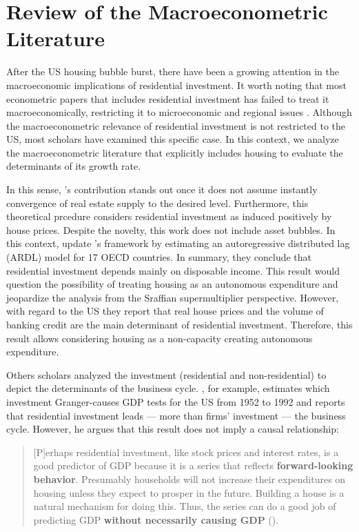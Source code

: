 \documentclass[11pt]{article}
\begin{document}
\section{Review of the Macroeconometric Literature}
\label{sec:org83eda64}
\label{sec:empirical_review}
After the US housing bubble burst, there have been a growing attention in the macroeconomic implications of residential investment.
It worth noting that most econometric papers that includes residential investment has failed to treat it macroeconomically, restricting it to microeconomic and regional issues \cite{arestis_u.s._2008}.
Although the macroeconometric relevance of residential investment is not restricted to the US, most scholars have examined this specific case.
In this context, we analyze the macroeconometric literature that explicitly includes housing to evaluate the determinants of its growth rate.

In this sense, \citeauthor{poterba_tax_1984}'s \citeyear{poterba_tax_1984} contribution stands out once it does not assume instantly convergence of real estate supply to the desired level.
Furthermore, this theoretical prcedure considers residential investment as induced positively by house prices.
Despite the novelty, this work does not include asset bubbles.
In this context,  \textcite{arestis_residential_2015} update \citeauthor{poterba_tax_1984}'s \citeyear{poterba_tax_1984} framework by estimating an autoregressive distributed lag (ARDL) model for 17 OECD countries.
In summary, they conclude that residential investment depends mainly on disposable income.
This result would  question the possibility of treating housing as an autonomous expenditure and jeopardize the analysis from the Sraffian supermultiplier perspective.
However, with regard to the US they report that real house prices and the volume of banking credit are the main determinant of residential investment.
Therefore, this result allows considering housing as a non-capacity creating autonomous expenditure.

Others scholars analyzed the investment (residential and non-residential) to depict the determinants of the business cycle.
\textcite{green_follow_1997}, for example, estimates which investment Granger-causes GDP tests for the US from 1952 to 1992 and reports that residential investment leads --- more than firms' investment --- the business cycle.
However, he argues that this result does not imply a causal relationship: 

\begin{quote}
[P]erhaps residential investment, like stock prices and interest rates, is a good predictor of GDP because it is a series that reflects \textbf{forward-looking behavior}. Presumably households will not increase their expenditures on housing unless they expect to prosper in the future. Building a house is a natural mechanism for doing this. Thus, the series can do a good job of predicting GDP \textbf{without necessarily causing GDP} (\cite[p.~267, ephasis added]{green_follow_1997}).
\end{quote}
\end{document}
